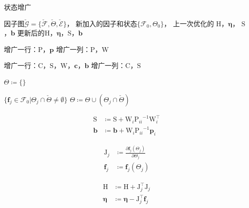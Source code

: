 \begin{algorithm}
\caption{状态增广}
\begin{algorithmic}
    \Require 因子图$\check{\mathcal{G}}=\{\check{\mathcal{F}},\check{\Theta},\check{\mathcal{E}}\}$，
             新加入的因子和状态$\{\mathcal{F}_0,\Theta_0\}$，
             上一次优化的
             $\mathrm{H}$，$\bm{\eta}$，
             $\mathrm{S}$，$\bm{b}$
    \Ensure 更新后的$\mathrm{H}$，$\bm{\eta}$，$\mathrm{S}$，$\bm{b}$

        \State 增广一行：$\mathrm{P}$，$\bm{p}$
        \State 增广一列：$\mathrm{P}$，$\mathrm{W}$
    \EndFor

        \State 增广一行：$\mathrm{C}$，$\mathrm{S}$，$\mathrm{W}$，$\bm{c}$，$\bm{b}$
        \State 增广一列：$\mathrm{C}$，$\mathrm{S}$
    \EndFor

    \State $\Theta\coloneqq\{\}$

    \ForAll
    {$\{
            \bm{f}_j\in\mathcal{F}_0 |
            \Theta_j \cap \check{\Theta} \neq \emptyset
    \}$}
        \State $\Theta \coloneqq \Theta \cup (\Theta_j \cap \check{\Theta})$
    \EndFor

        \[\begin{aligned}
                \mathrm{S} &\coloneqq \mathrm{S} + \mathrm{W}_i{\mathrm{P}_{ii}}^{-1}\mathrm{W}_i^\top \\
                \bm{b}     &\coloneqq \bm{b}     + \mathrm{W}_i{\mathrm{P}_{ii}}^{-1}\bm{p}_i
        \end{aligned}\]
    \EndFor

        \[\begin{aligned}
                \mathrm{J}_j &\coloneqq \frac{\partial{\bm{f}_j}(\Theta_j)}
                                             {\partial{\Theta_j}} \\
                \bm{f}_j     &\coloneqq \bm{f}_j(\Theta_j)
        \end{aligned}\]

        \[\begin{aligned}
                \mathrm{H} &\coloneqq \mathrm{H} + \mathrm{J}_j^\top\mathrm{J}_j \\
                \bm{\eta}  &\coloneqq \bm{\eta}  - \mathrm{J}_j^\top\bm{f}_j
        \end{aligned}\]
    \EndFor


\end{algorithmic}
\end{algorithm}
